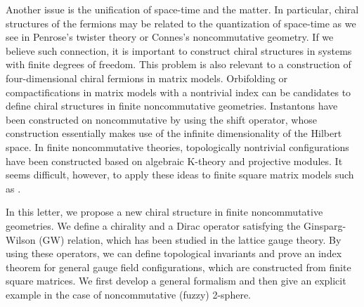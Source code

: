\documentclass[a4paper,prl,showpacs,twocolumn]{revtex4}
\begin{document}
Another issue is the unification of space-time and the matter.
In particular, chiral structures of the fermions may 
be related to the quantization of space-time as we see in 
Penrose's twister theory or Connes's noncommutative geometry.
If we believe such connection, it is important to construct
chiral structures in systems with finite degrees of freedom.
This problem is also relevant to a construction of  four-dimensional
chiral fermions in matrix models.
Orbifolding\cite{AIS} or compactifications 
in matrix models with a nontrivial index 
can be candidates to define chiral structures in finite 
noncommutative geometries.
Instantons have been constructed
on noncommutative \coordHE{} by using the shift 
operator\cite{instanton,harvey}, 
whose construction  essentially makes use of the infinite 
dimensionality of the Hilbert space.
In finite noncommutative theories, topologically nontrivial 
configurations have been constructed based on algebraic 
K-theory and projective modules\cite{Connes,balatop}. 
It seems difficult, however, to apply these ideas to finite 
square matrix models such as \cite{IKKT}.
\par
In this letter, we propose a new chiral structure in finite
noncommutative geometries. We define a chirality and a Dirac
operator satisfying the Ginsparg-Wilson (GW) relation, which 
has been studied in the lattice gauge theory.
By using these operators, we can define  topological invariants
and prove an index theorem for general gauge field 
configurations, which are constructed from finite square 
matrices.
We first develop a general formalism and then give an explicit
example in the case of noncommutative (fuzzy) 2-sphere.
\end{document}
